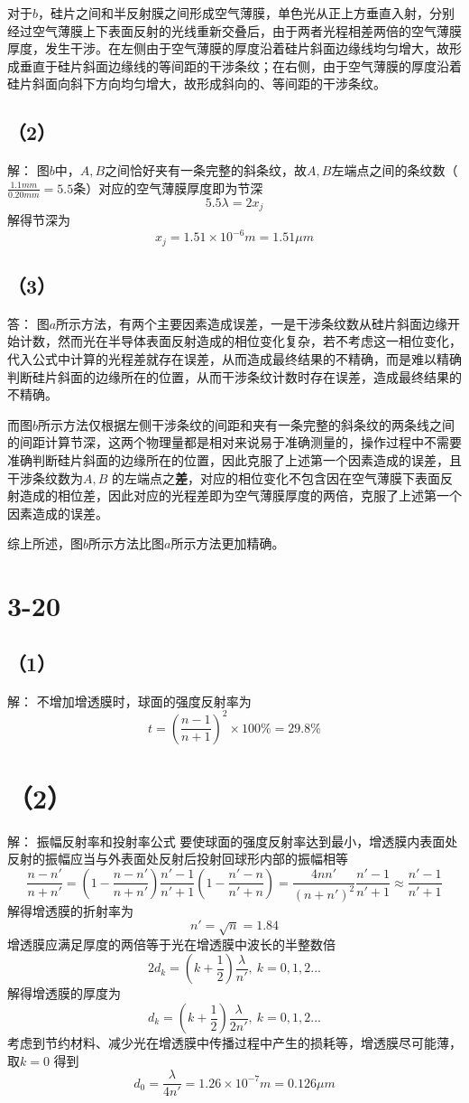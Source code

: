 \documentclass[10pt,a4paper]{article}
\begin{document}
对于$b$，硅片之间和半反射膜之间形成空气薄膜，单色光从正上方垂直入射，分别经过空气薄膜上下表面反射的光线重新交叠后，由于两者光程相差两倍的空气薄膜厚度，发生干涉。在左侧由于空气薄膜的厚度沿着硅片斜面边缘线均匀增大，故形成垂直于硅片斜面边缘线的等间距的干涉条纹；在右侧，由于空气薄膜的厚度沿着硅片斜面向斜下方向均匀增大，故形成斜向的、等间距的干涉条纹。
\subsection*{（2）}解：
图$b$中，$A,B$之间恰好夹有一条完整的斜条纹，故$A,B$左端点之间的条纹数（$\frac{1.1mm}{0.20mm} = 5.5$条）对应的空气薄膜厚度即为节深
\[
5.5\lambda = 2x_j
\]
解得节深为
\[
x_j = 1.51\times10^{-6}m = 1.51\mu m
\]
\subsection*{（3）}答：
图$a$所示方法，有两个主要因素造成误差，一是干涉条纹数从硅片斜面边缘开始计数，然而光在半导体表面反射造成的相位变化复杂，若不考虑这一相位变化，代入公式中计算的光程差就存在误差，从而造成最终结果的不精确，而是难以精确判断硅片斜面的边缘所在的位置，从而干涉条纹计数时存在误差，造成最终结果的不精确。

而图$b$所示方法仅根据左侧干涉条纹的间距和夹有一条完整的斜条纹的两条线之间的间距计算节深，这两个物理量都是相对来说易于准确测量的，操作过程中不需要准确判断硅片斜面的边缘所在的位置，因此克服了上述第一个因素造成的误差，且干涉条纹数为$A,B$ 的左端点之\textbf{差}，对应的相位变化不包含因在空气薄膜下表面反射造成的相位差，因此对应的光程差即为空气薄膜厚度的两倍，克服了上述第一个因素造成的误差。

综上所述，图$b$所示方法比图$a$所示方法更加精确。
\section*{3-20}
\subsection{（1）}解：
不增加增透膜时，球面的强度反射率为
\[
t = (\frac{n - 1}{n + 1})^2 \times 100\%= 29.8\%
\]
\section*{（2）}解：
振幅反射率和投射率公式
要使球面的强度反射率达到最小，增透膜内表面处反射的振幅应当与外表面处反射后投射回球形内部的振幅相等
\[
\frac{n - n'}{n + n'} = (1 - \frac{n - n'}{n + n'})\frac{n' - 1}{n' + 1}(1 - \frac{n' - n}{n' + n}) = \frac{4nn'}{(n + n')^2}\frac{n' - 1}{n' + 1} \approx \frac{n' - 1}{n' + 1}
\]
解得增透膜的折射率为
\[
n' = \sqrt{n} = 1.84
\]
增透膜应满足厚度的两倍等于光在增透膜中波长的半整数倍
\[
2d_k = (k + \frac{1}{2})\frac{\lambda}{n'},~k = 0,1,2...
\]
解得增透膜的厚度为
\[
d_k = (k + \frac{1}{2})\frac{\lambda}{2n'},~k = 0,1,2...
\]
考虑到节约材料、减少光在增透膜中传播过程中产生的损耗等，增透膜尽可能薄，取$k = 0$ 得到
\[
d_0 = \frac{\lambda}{4n'} = 1.26\times10^{-7}m = 0.126\mu m
\]
\end{document}
